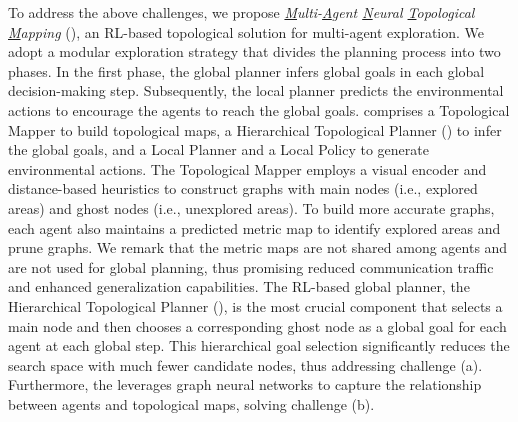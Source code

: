 






To address the above challenges, we propose \emph{\underline{M}ulti-\underline{A}gent \underline{N}eural \underline{T}opological \underline{M}apping} (\name), an RL-based topological solution for multi-agent exploration. We adopt a modular exploration strategy that divides the planning process into two phases. In the first phase, the global planner infers global goals in each global decision-making step. Subsequently, the local planner predicts the environmental actions to encourage the agents to reach the global goals. {\name} comprises a Topological Mapper to build topological maps, a Hierarchical Topological Planner (\planner) to infer the global goals, and a Local Planner and a Local Policy to generate environmental actions. The Topological Mapper employs a visual encoder and distance-based heuristics to construct graphs with main nodes (i.e., explored areas) and ghost nodes (i.e., unexplored areas). To build more accurate graphs, each agent also maintains a predicted metric map to identify explored areas and prune graphs. We remark that the metric maps are not shared among agents and are not used for global planning, thus promising reduced communication traffic and enhanced generalization capabilities. The RL-based global planner, the Hierarchical Topological Planner ({\planner}), is the most crucial component that selects a main node and then chooses a corresponding ghost node as a global goal for each agent at each global step. This hierarchical goal selection significantly reduces the search space with much fewer candidate nodes, thus addressing challenge (a).
Furthermore, the {\planner} leverages graph neural networks to capture the relationship between agents and topological maps, solving challenge (b).


